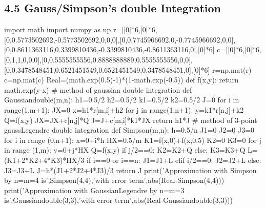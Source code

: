 \documentclass{article}
\begin{document}
    \subsection{4.5 Gauss/Simpson's double Integration}
    \begin{python}
    import math
    import numpy as np
    r=[[0]*6,[0]*6,[0,0.5773502692,-0.5773502692,0,0,0],[0,0.7745966692,0,-0.7745966692,0,0],
    [0,0.8611363116,0.3399810436,-0.3399810436,-0.8611363116,0],[0]*6]
    c=[[0]*6,[0]*6,[0,1,1,0,0,0],[0,0.5555555556,0.8888888889,0.5555555556,0,0],
    [0,0.3478548451,0.6521451549,0.6521451549,0.3478548451,0],[0]*6]
    r=np.mat(r)
    c=np.mat(c)
    Real=(math.exp(0.5)-1)*(1-math.exp(-0.5))
    def f(x,y):
        return math.exp(y-x)
    # method of gaussian double integration
    def Gaussiandouble(m,n):
        h1=0.5/2
        h2=0.5/2
        k1=0.5/2
        k2=0.5/2
        J=0
        for i in range(1,m+1):
            JX=0
            x=h1*r[m,i]+h2
            for j in range(1,n+1):
                y=k1*r[n,j]+k2
                Q=f(x,y)
                JX=JX+c[n,j]*Q
            J=J+c[m,i]*k1*JX
        return h1*J
    # method of 3-point gaussLegendre double integration
    def Simpson(m,n):
        h=0.5/n
        J1=0
        J2=0
        J3=0
        for i in range (0,n+1):
            x=0+i*h
            HX=0.5/m
            K1=f(x,0)+f(x,0.5)
            K2=0
            K3=0
            for j in range (1,m):
                y=0+j*HX
                Q=f(x,y)
                if j/2==0:
                    K2=K2+Q
                else:
                    K3=K3+Q
            L=(K1+2*K2+4*K3)*HX/3
            if i==0 or i==n:
                J1=J1+L 
            elif i/2==0:
                J2=J2+L 
            else:
                J3=J3+L 
        J=h*(J1+2*J2+4*J3)/3
        return J
    print('Approximation with Simpson by n=m=4 is',Simpson(4,4),'with error term',abs(Real-Simpson(4,4)))
    print('Approximation with GaussianLegendre by n=m=3 is',Gaussiandouble(3,3),'with error term',abs(Real-Gaussiandouble(3,3)))
    \end{python}
\end{document}

